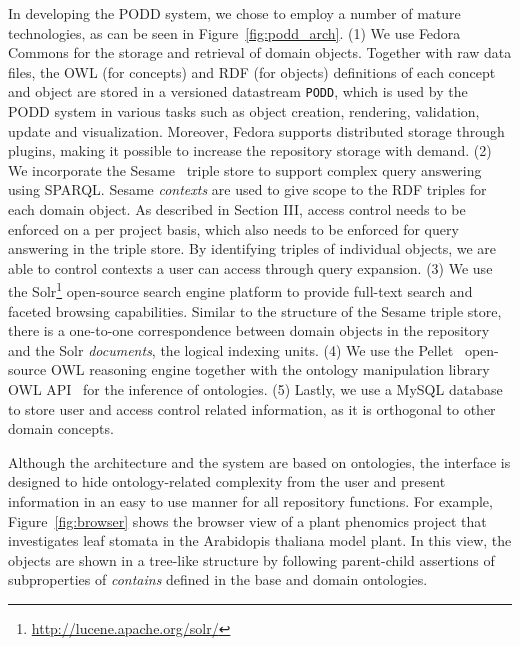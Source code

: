 \documentclass[preprint,12pt]{elsarticle}
\begin{document}
In developing the PODD system, we chose to employ a number of mature technologies, as can be seen in Figure~\ref{fig:podd_arch}. (1) We use Fedora Commons for the storage and retrieval of domain objects. Together with raw data files, the OWL (for concepts) and RDF (for objects) definitions of each concept and object are stored in a versioned datastream \texttt{PODD}, which is used by the PODD system in various tasks such as object creation, rendering, validation, update and visualization. Moreover, Fedora supports distributed storage through plugins, making it possible to increase the repository storage with demand. (2) We incorporate the Sesame~\cite{conf/iswc02/sesame} triple store to support complex query answering using SPARQL. Sesame \emph{contexts} are used to give scope to the RDF triples for each domain object. As described in Section III, access control needs to be enforced on a per project basis, which also needs to be enforced for query answering in the triple store. By identifying triples of individual objects, we are able to control contexts a user can access through query expansion. (3) We use the Solr\footnote{\url{http://lucene.apache.org/solr/}} open-source search engine platform to provide full-text search and faceted browsing capabilities. Similar to the structure of the Sesame triple store, there is a one-to-one correspondence between domain objects in the repository and the Solr \emph{documents}, the logical indexing units. (4) We use the Pellet~\cite{citeulike:2615678} open-source OWL reasoning engine together with the ontology manipulation library OWL API~\cite{citeulike:6578934} for the inference of ontologies. (5) Lastly, we use a MySQL database to store user and access control related information, as it is orthogonal to other domain concepts.

Although the architecture and the system are based on ontologies, the interface is designed to hide ontology-related complexity from the user and present information in an easy to use manner for all repository functions. For example, Figure~\ref{fig:browser} shows the browser view of a plant phenomics project that investigates leaf stomata in the Arabidopis thaliana model plant. In this view, the objects are shown in a tree-like structure by following parent-child assertions of subproperties of \emph{contains} defined in  the base and domain ontologies.
\end{document}
